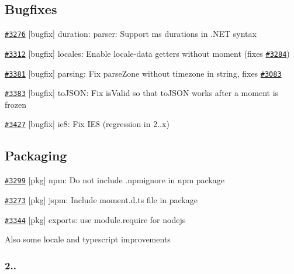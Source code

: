 \subsection*{Bugfixes}


\begin{DoxyItemize}
\item \href{https://github.com/moment/moment/pull/3276}{\tt \#3276} \mbox{[}bugfix\mbox{]} duration\+: parser\+: Support ms durations in .N\+ET syntax
\item \href{https://github.com/moment/moment/pull/3312}{\tt \#3312} \mbox{[}bugfix\mbox{]} locales\+: Enable locale-\/data getters without moment (fixes \href{https://github.com/moment/moment/issues/3284}{\tt \#3284})
\item \href{https://github.com/moment/moment/pull/3381}{\tt \#3381} \mbox{[}bugfix\mbox{]} parsing\+: Fix parse\+Zone without timezone in string, fixes \href{https://github.com/moment/moment/issues/3083}{\tt \#3083}
\item \href{https://github.com/moment/moment/pull/3383}{\tt \#3383} \mbox{[}bugfix\mbox{]} to\+J\+S\+ON\+: Fix is\+Valid so that to\+J\+S\+ON works after a moment is frozen
\item \href{https://github.com/moment/moment/pull/3427}{\tt \#3427} \mbox{[}bugfix\mbox{]} ie8\+: Fix I\+E8 (regression in 2..\+x)
\end{DoxyItemize}

\subsection*{Packaging}


\begin{DoxyItemize}
\item \href{https://github.com/moment/moment/pull/3299}{\tt \#3299} \mbox{[}pkg\mbox{]} npm\+: Do not include .npmignore in npm package
\item \href{https://github.com/moment/moment/pull/3273}{\tt \#3273} \mbox{[}pkg\mbox{]} jspm\+: Include moment.\+d.\+ts file in package
\item \href{https://github.com/moment/moment/pull/3344}{\tt \#3344} \mbox{[}pkg\mbox{]} exports\+: use module.\+require for nodejs
\end{DoxyItemize}

Also some locale and typescript improvements

\subsubsection*{2..}


